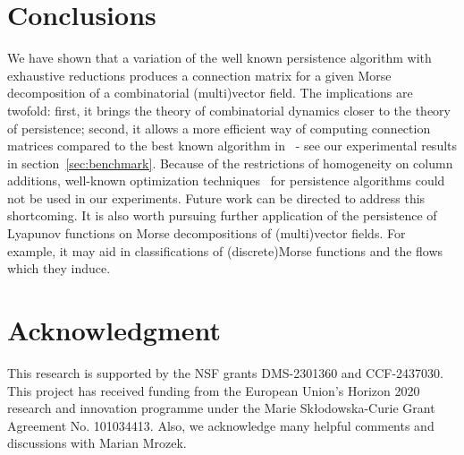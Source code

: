 \documentclass[a4paper,english,cleveref]{article}
\theoremstyle{plain}
\newcounter{li}
\begin{document}
 \section{Conclusions} We have shown that a variation of the well known persistence algorithm with exhaustive reductions produces a connection matrix for a given
    Morse decomposition of a combinatorial (multi)vector field. The implications are twofold: first, it brings
    the theory of combinatorial dynamics closer to the theory of persistence; second,
    it allows a more efficient way of computing connection matrices compared
    to the best known algorithm in~\cite{DLMS24} - see our experimental results in section~\ref{sec:benchmark}. Because of the restrictions of homogeneity on column additions, well-known optimization techniques~\cite{bauer2014clear,wagner2012} for persistence algorithms could not be used
    in our experiments. Future work can be directed to address this shortcoming. It is also worth pursuing further application of the persistence of Lyapunov functions on Morse decompositions of (multi)vector fields. For example, it may aid in classifications of (discrete)Morse functions and the flows which they induce.

    \section*{Acknowledgment} This research is supported by the NSF grants DMS-2301360 and CCF-2437030.
    This project has received funding from the European Union’s Horizon 2020 research and innovation programme under the Marie Skłodowska-Curie Grant Agreement No. 101034413.
    Also, we acknowledge many helpful comments and discussions with Marian Mrozek.



\end{document}
